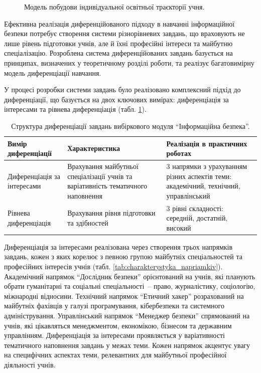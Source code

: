 \begin{figure}[h]
\begin{tikzpicture}[node distance=1cm, auto]
    \end{tikzpicture}    
    \caption{Модель побудови індивідуальної освітньої траєкторії учня.}
    \label{fig:individual_track_model}
\end{figure}

Ефективна реалізація диференційованого підходу в навчанні інформаційної безпеки потребує створення системи різнорівневих завдань, що враховують не лише рівень підготовки учнів, але й їхні професійні інтереси та майбутню спеціалізацію. Розроблена система диференційованих завдань базується на принципах, визначених у теоретичному розділі роботи, та реалізує багатовимірну модель диференціації навчання.

У процесі розробки системи завдань було реалізовано комплексний підхід до диференціації, що базується на двох ключових вимірах: диференціація за інтересами та рівнева диференціація (табл. \ref{tab:dyferentsiatsia}).

\begin{longtable}{|p{}|p{}|p{}|}
\caption{Структура диференціації завдань вибіркового модуля ``Інформаційна безпека''.}
\label{tab:dyferentsiatsia} %
\\
\hline
\textbf{Вимір диференціації} & \textbf{Характеристика} & \textbf{Реалізація в практичних роботах } \\ \hline

Диференціація за інтересами& Врахування майбутньої спеціалізації учнів та варіативність тематичного наповнення  & 3 напрямки з урахуванням різних аспектів теми: академічний, технічний, управлінський \\ \hline
Рівнева диференціація & Врахування рівня підготовки та здібностей & 3 рівні складності: середній, достатній, високий \\ \hline
\end{longtable}

Диференціація за інтересами реалізована через створення трьох напрямків завдань, кожен з яких корелює з певною групою майбутніх спеціальностей та професійних інтересів учнів (табл. \ref{tab:charakterystyka_napriamkiv}). Академічний напрямок ``Дослідник безпеки'' орієнтований на учнів, які планують обрати гуманітарні та соціальні спеціальності~-- право, журналістику, соціологію, міжнародні відносини. Технічний напрямок ``Етичний хакер'' розрахований на майбутніх фахівців у галузі програмування, кібербезпеки та системного адміністрування. Управлінський напрямок ``Менеджер безпеки'' спрямований на учнів, які цікавляться менеджментом, економікою, бізнесом та державним управлінням. 
Диференціація за інтересами проявляється у варіативності тематичного наповнення завдань у межах теми. Кожен напрямок акцентує увагу на специфічних аспектах теми, релевантних для майбутньої професійної діяльності учнів.

